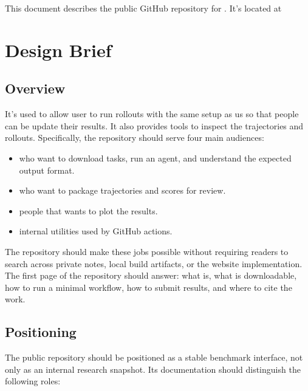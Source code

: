 \documentclass[11pt]{article}
\begin{document}
\label{docstart:public_repository}
\label{sec:public-repository}

This document describes the public GitHub repository for \name{}.
It's located at \href{https://github.com/TommasoBendinelli/TraceBench.git}{}


\label{sec:public-repository-design-brief}
\section*{Design Brief}

\label{sec:public-repository-overview}
\subsection*{Overview}

It's used to allow user to run rollouts with the same setup as us so that people can be update their results.
It also provides tools to inspect the trajectories and rollouts.
Specifically, the repository should serve four main audiences:

\begin{itemize}
\item who want to download tasks, run an agent, and understand the expected output format.
\item who want to package trajectories and scores for review.
\item people that wants to plot the results.    
\item internal utilities used by GitHub actions.
\end{itemize}

The repository should make these jobs possible without requiring readers to search across private notes, local build artifacts, or the website implementation.
The first page of the repository should answer: what \name{} is, what is downloadable, how to run a minimal workflow, how to submit results, and where to cite the work.

\label{sec:public-repository-positioning}
\subsection*{Positioning}

The public repository should be positioned as a stable benchmark interface, not only as an internal research snapshot.
Its documentation should distinguish the following roles:
\end{document}
